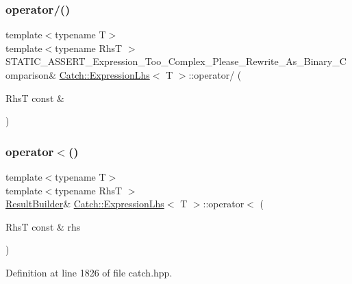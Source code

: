 \hypertarget{class_catch_1_1_expression_lhs_a37d50565046ac9b1c9159a7c0cf88a1e}{}\label{class_catch_1_1_expression_lhs_a37d50565046ac9b1c9159a7c0cf88a1e} 
\subsubsection{\texorpdfstring{operator/()}{operator/()}}
{\footnotesize\ttfamily template$<$typename T$>$ \\
template$<$typename RhsT $>$ \\
S\+T\+A\+T\+I\+C\+\_\+\+A\+S\+S\+E\+R\+T\+\_\+\+Expression\+\_\+\+Too\+\_\+\+Complex\+\_\+\+Please\+\_\+\+Rewrite\+\_\+\+As\+\_\+\+Binary\+\_\+\+Comparison\& \hyperlink{class_catch_1_1_expression_lhs}{Catch\+::\+Expression\+Lhs}$<$ T $>$\+::operator/ (\begin{DoxyParamCaption}\item[{RhsT const \&}]{ }\end{DoxyParamCaption})}

\hypertarget{class_catch_1_1_expression_lhs_a48428d358ddc89729e2e3407f4024dac}{}\label{class_catch_1_1_expression_lhs_a48428d358ddc89729e2e3407f4024dac} 
\subsubsection{\texorpdfstring{operator$<$()}{operator<()}}
{\footnotesize\ttfamily template$<$typename T$>$ \\
template$<$typename RhsT $>$ \\
\hyperlink{class_catch_1_1_result_builder}{Result\+Builder}\& \hyperlink{class_catch_1_1_expression_lhs}{Catch\+::\+Expression\+Lhs}$<$ T $>$\+::operator$<$ (\begin{DoxyParamCaption}\item[{RhsT const \&}]{rhs }\end{DoxyParamCaption})\hspace{0.3cm}{\ttfamily [inline]}}



Definition at line 1826 of file catch.\+hpp.

\hypertarget{class_catch_1_1_expression_lhs_afd188990e8a14b49c308ce7a79056846}{}\label{class_catch_1_1_expression_lhs_afd188990e8a14b49c308ce7a79056846} 
